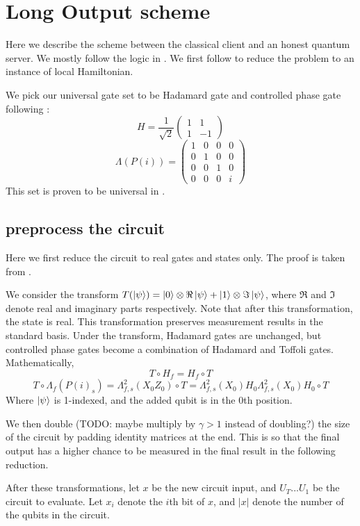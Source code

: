 \section{Long Output scheme}

Here we describe the scheme between the classical client and an honest quantum server. We mostly follow the logic in \cite{mahadev_delegation}. We first follow \cite{kempe_kitaev_regev_2006} to reduce the problem to an instance of local Hamiltonian.

We pick our universal gate set to be Hadamard gate and controlled phase gate following \cite{quant-ph/0301040}:
$$H=\frac{1}{\sqrt{2}}\begin{pmatrix}1&1\\1&-1\end{pmatrix}$$
$$\Lambda(P(i))=\begin{pmatrix}1&0&0&0\\0&1&0&0\\0&0&1&0\\0&0&0&i\end{pmatrix}$$
This set is proven to be universal in \cite{kitaev_1997}.

\subsection{preprocess the circuit}

Here we first reduce the circuit to real gates and states only. The proof is taken from \cite{quant-ph/0301040}.

We consider the transform $T(\ket{\psi})=\ket{0}\otimes\Re\ket{\psi}+\ket{1}\otimes\Im\ket{\psi}$, where $\Re$ and $\Im$ denote real and imaginary parts respectively. Note that after this transformation, the state is real. This transformation preserves measurement results in the standard basis. Under the transform, Hadamard gates are unchanged, but controlled phase gates become a combination of Hadamard and Toffoli gates. Mathematically,
$$T\circ H_f=H_f\circ T$$
$$T\circ\Lambda_f(P(i)_s)=\Lambda^2_{f,s}(X_0Z_0)\circ T=\Lambda^2_{f,s}(X_0)H_0\Lambda^2_{f,s}(X_0)H_0\circ T$$
Where $\ket{\psi}$ is 1-indexed, and the added qubit is in the 0th position. 

We then double (TODO: maybe multiply by $\gamma>1$ instead of doubling?) the size of the circuit by padding identity matrices at the end. This is so that the final output has a higher chance to be measured in the final result in the following reduction.

After these transformations, let $x$ be the new circuit input, and $U_T...U_1$ be the circuit to evaluate. Let $x_i$ denote the $i$th bit of $x$, and $|x|$ denote the number of the qubits in the circuit.

